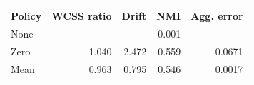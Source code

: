 \begin{tabular}{lrrrr}
\toprule
Policy & WCSS ratio & Drift & NMI & Agg. error \\
\midrule
None & -- & -- & 0.001 & -- \\
Zero & 1.040 & 2.472 & 0.559 & 0.0671 \\
Mean & 0.963 & 0.795 & 0.546 & 0.0017 \\
\bottomrule
\end{tabular}
